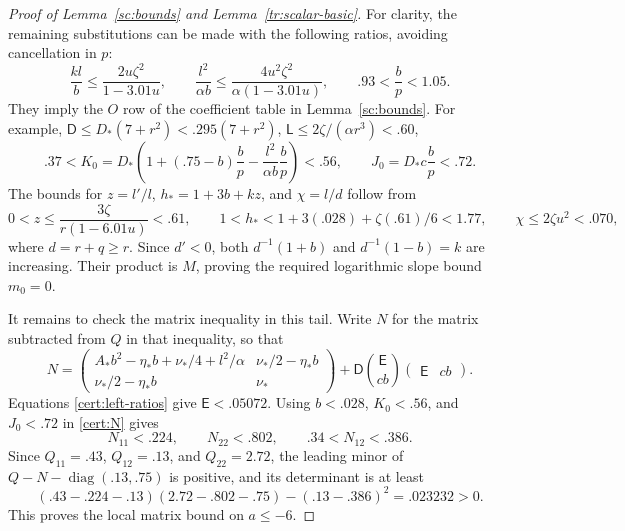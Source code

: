 \documentclass[11pt]{article}
\theoremstyle{definition}
\theoremstyle{remark}
\numberwithin{equation}{section}
\begin{document}
\begin{proof}[Proof of Lemma~\ref{sc:bounds} and Lemma~\ref{tr:scalar-basic}]
For clarity, the remaining substitutions can be made with the following
ratios, avoiding cancellation in $p$:
\begin{equation}\label{cert:left-ratios}
 \frac{kl}{b}\le\frac{2u\zeta^2}{1-3.01u},\qquad
 \frac{l^2}{\alpha b}\le\frac{4u^2\zeta^2}{\alpha(1-3.01u)},
 \qquad .93<\frac bp<1.05.
\end{equation}
They imply the $O$ row of the coefficient table in Lemma~\ref{sc:bounds}.
For example, $\mathsf D\le D_*(7+r^2)<.295(7+r^2)$,
$\mathsf L\le2\zeta/(\alpha r^3)<.60$,
\[
 .37<K_0=D_*\left(1+( .75-b)\frac bp-
              \frac{l^2}{\alpha b}\frac bp\right)<.56,
 \qquad J_0=D_*c\frac bp<.72.
\]
The bounds for $z=l'/l$, $h_*=1+3b+kz$, and $\chi=l/d$ follow from
\[
 0<z\le\frac{3\zeta}{r(1-6.01u)}<.61,\qquad
 1<h_*<1+3(.028)+\zeta(.61)/6<1.77,
 \qquad \chi\le2\zeta u^2<.070,
\]
where $d=r+q\ge r$. Since $d'<0$, both $d^{-1}(1+b)$ and
$d^{-1}(1-b)=k$ are increasing. Their product is $M$, proving the
required logarithmic slope bound $m_0=0$.

It remains to check the matrix inequality in this tail. Write $N$ for the
matrix subtracted from $Q$ in that inequality, so that
\begin{equation}\label{cert:N}
 N=\begin{pmatrix}
 A_*b^2-\eta_*b+\nu_*/4+l^2/\alpha&\nu_*/2-\eta_*b\\
 \nu_*/2-\eta_*b&\nu_*
 \end{pmatrix}
 +\mathsf D\binom{\mathsf E}{cb}
                  \begin{pmatrix}\mathsf E&cb\end{pmatrix}.
\end{equation}
Equations \eqref{cert:left-ratios} give $\mathsf E<.05072$.
Using $b<.028$, $K_0<.56$, and $J_0<.72$ in \eqref{cert:N} gives
\[
 N_{11}<.224,\qquad N_{22}<.802,\qquad .34<N_{12}<.386.
\]
Since $Q_{11}=.43$, $Q_{12}=.13$, and $Q_{22}=2.72$, the leading
minor of $Q-N-\operatorname{diag}(.13,.75)$ is positive, and its
determinant is at least
\[
 (.43-.224-.13)(2.72-.802-.75)-(.13-.386)^2
 =.023232>0.
\]
This proves the local matrix bound on $a\le-6$.


\end{proof}
\end{document}
